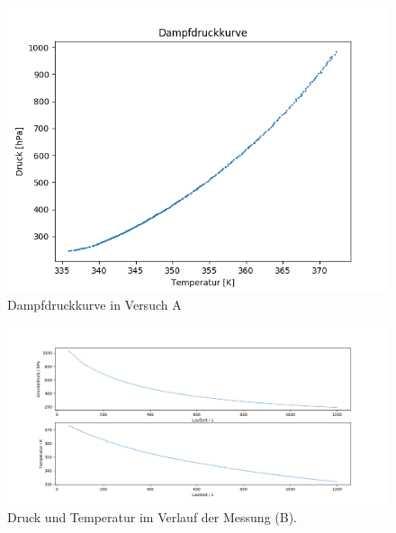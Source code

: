 \documentclass[12pt,a4paper]{article}
\begin{document}
\begin{figure}[H]
\includegraphics[scale=0.9]{Bilder/DampfdruckkurveA.png}
\caption[Dampfdruckkurve A]{Dampfdruckkurve in Versuch A}
\label{fig:DampfA}
\end{figure}

\begin{figure}[H]
\begin{center}
\includegraphics[scale=0.4]{Bilder/Rohdaten_HauptmessungB}
\caption[Rohdaten B]{Druck und Temperatur im Verlauf der Messung (B).}
\label{fig:RohdatenB}
\end{center}
\end{figure}
\end{document}
